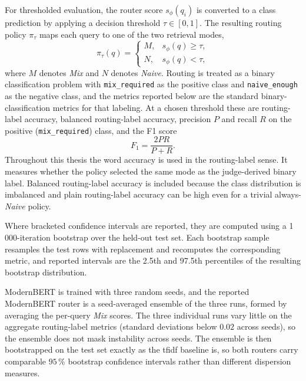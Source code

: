 \documentclass[english, bibtex]{kththesis}               %
\numberwithin{listing}{chapter}
\begin{document}
For thresholded evaluation, the router score \(s_\phi(q_i)\) is converted to a class prediction by applying a decision threshold \(\tau \in [0, 1]\). The resulting routing policy \(\pi_\tau\) maps each query to one of the two retrieval modes,
\begin{equation}
\label{eq:routingPolicy}
\pi_\tau(q) =
\begin{cases}
M, & s_\phi(q) \geq \tau,\\
N, & s_\phi(q) < \tau,
\end{cases}
\end{equation}
where \(M\) denotes \emph{Mix} and \(N\) denotes \emph{Naive}. Routing is treated as a binary classification problem with \texttt{mix\_required} as the positive class and \texttt{naive\_enough} as the negative class, and the metrics reported below are the standard binary-classification metrics for that labeling. At a chosen threshold these are routing-label accuracy, balanced routing-label accuracy, precision \(P\) and recall \(R\) on the positive (\texttt{mix\_required}) class, and the F1 score
\begin{equation}
\label{eq:f1}
F_1 = \frac{2 P R}{P + R}.
\end{equation}
Throughout this thesis the word accuracy is used in the routing-label sense. It measures whether the policy selected the same mode as the judge-derived binary label. Balanced routing-label accuracy is included because the class distribution is imbalanced and plain routing-label accuracy can be high even for a trivial always-\emph{Naive} policy.

Where bracketed confidence intervals are reported, they are computed using a 1\,000-iteration bootstrap over the held-out test set. Each bootstrap sample resamples the test rows with replacement and recomputes the corresponding metric, and reported intervals are the 2.5th and 97.5th percentiles of the resulting bootstrap distribution.

ModernBERT is trained with three random seeds, and the reported ModernBERT router is a seed-averaged ensemble of the three runs, formed by averaging the per-query \emph{Mix} scores. The three individual runs vary little on the aggregate routing-label metrics (standard deviations below $0.02$ across seeds), so the ensemble does not mask instability across seeds. The ensemble is then bootstrapped on the test set exactly as the \gls{tfidf} baseline is, so both routers carry comparable $95\,\%$ bootstrap confidence intervals rather than different dispersion measures.
\end{document}
